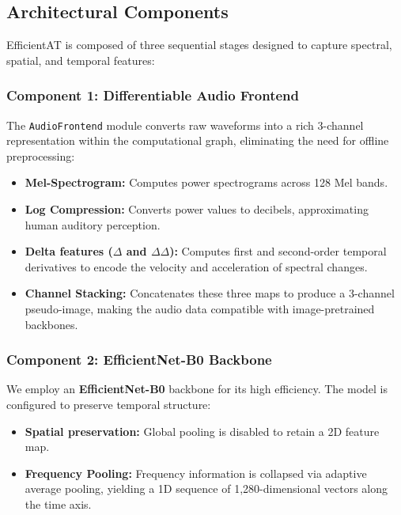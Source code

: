 \subsection{Architectural Components}
EfficientAT is composed of three sequential stages designed to capture spectral, spatial, and temporal features:

\subsubsection{Component 1: Differentiable Audio Frontend}
The \texttt{AudioFrontend} module converts raw waveforms into a rich 3-channel representation within the computational graph, eliminating the need for offline preprocessing:
\begin{itemize}
    \item \textbf{Mel-Spectrogram:} Computes power spectrograms across 128 Mel bands.
    \item \textbf{Log Compression:} Converts power values to decibels, approximating human auditory perception.
    \item \textbf{Delta features ($\Delta$ and $\Delta\Delta$):} Computes first and second-order temporal derivatives to encode the velocity and acceleration of spectral changes.
    \item \textbf{Channel Stacking:} Concatenates these three maps to produce a 3-channel pseudo-image, making the audio data compatible with image-pretrained backbones.
\end{itemize}

\subsubsection{Component 2: EfficientNet-B0 Backbone}
We employ an \textbf{EfficientNet-B0} backbone \cite{efficientnet2019} for its high efficiency. The model is configured to preserve temporal structure:
\begin{itemize}
    \item \textbf{Spatial preservation:} Global pooling is disabled to retain a 2D feature map.
    \item \textbf{Frequency Pooling:} Frequency information is collapsed via adaptive average pooling, yielding a 1D sequence of 1,280-dimensional vectors along the time axis.
\end{itemize}

